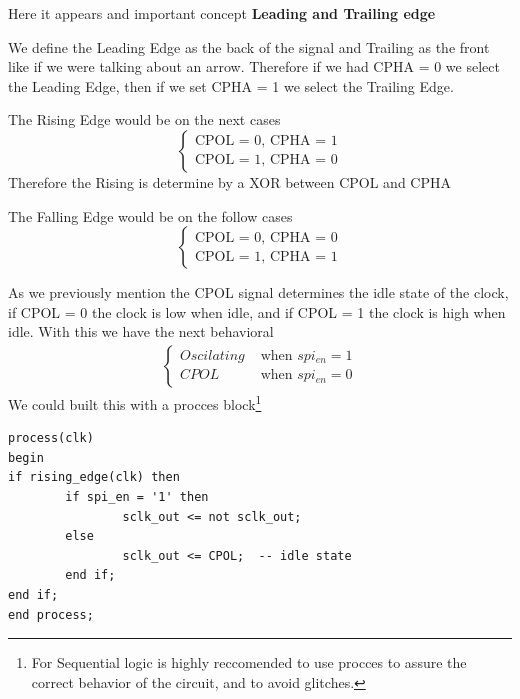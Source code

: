 \documentclass[12pt]{article}
\begin{document}
Here it appears and important concept \textbf{Leading and Trailing edge}

We define the Leading Edge as the back of the signal and Trailing as the front like if we were talking about an arrow. Therefore if we had CPHA = 0 we select the Leading Edge, then if we set CPHA = 1 we select the Trailing Edge.

The Rising Edge would be on the next cases
$$
\begin{cases}
\text{CPOL = 0, CPHA = 1} \\
\text{CPOL = 1, CPHA = 0}
\end{cases}
$$
Therefore the Rising is determine by a XOR between CPOL and CPHA


The Falling Edge would be on the follow cases
$$
\begin{cases}
\text{CPOL = 0, CPHA = 0} \\
\text{CPOL = 1, CPHA = 1}
\end{cases}
$$

As we previously mention the CPOL signal determines the idle state of the clock, if CPOL = 0 the clock is low when idle, and if CPOL = 1 the clock is high when idle. With this we have the next behavioral
$$
\begin{aligned}
\begin{cases}
    Oscilating &\text{ when } spi_{en} = 1\\
    CPOL       &\text{ when } spi_{en} = 0
\end{cases}
\end{aligned}
$$
We could built this with a procces block\footnote{For Sequential logic is highly reccomended to use procces to assure the correct behavior of the circuit, and to avoid glitches.} 
\begin{verbatim}
process(clk)
begin
if rising_edge(clk) then
        if spi_en = '1' then
                sclk_out <= not sclk_out;
        else
                sclk_out <= CPOL;  -- idle state
        end if;
end if;
end process;
\end{verbatim}
\end{document}
